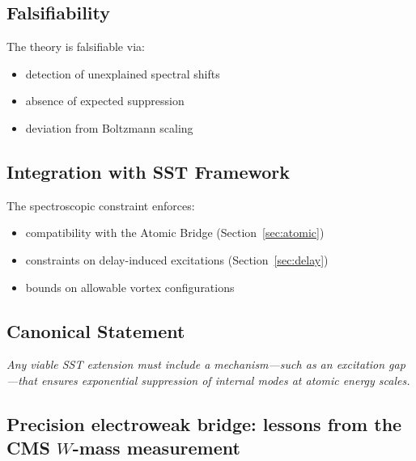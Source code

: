 \documentclass[11pt]{article}
\theoremstyle{definition}
\theoremstyle{plain}
\theoremstyle{remark}
\begin{document}
    \subsection{Falsifiability}
        
        The theory is falsifiable via:
        
        \begin{itemize}
            \item detection of unexplained spectral shifts
            \item absence of expected suppression
            \item deviation from Boltzmann scaling
        \end{itemize}
    
    \subsection{Integration with SST Framework}
        
        The spectroscopic constraint enforces:
        
        \begin{itemize}
            \item compatibility with the Atomic Bridge (Section~\ref{sec:atomic})
            \item constraints on delay-induced excitations (Section~\ref{sec:delay})
            \item bounds on allowable vortex configurations
        \end{itemize}
    
    \subsection{Canonical Statement}
        
        \begin{center}
            \textit{
                Any viable SST extension must include a mechanism—such as an excitation gap—that ensures exponential suppression of internal modes at atomic energy scales.
            }
        \end{center}

    \subsection{Precision electroweak bridge: lessons from the CMS \texorpdfstring{$W$}{W}-mass measurement}
        \label{subsec:cms-w-mass-bridge}
    
\end{document}
